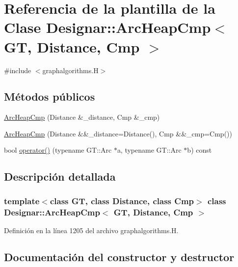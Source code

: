 \hypertarget{class_designar_1_1_arc_heap_cmp}{}\section{Referencia de la plantilla de la Clase Designar\+:\+:Arc\+Heap\+Cmp$<$ GT, Distance, Cmp $>$}
\label{class_designar_1_1_arc_heap_cmp}


{\ttfamily \#include $<$graphalgorithms.\+H$>$}

\subsection*{Métodos públicos}
\begin{DoxyCompactItemize}
\item 
\hyperlink{class_designar_1_1_arc_heap_cmp_a0fcb5ba151f45638b73534dc80af8a81}{Arc\+Heap\+Cmp} (Distance \&\+\_\+distance, Cmp \&\+\_\+cmp)
\item 
\hyperlink{class_designar_1_1_arc_heap_cmp_a4a698d49f62f6261afcf3c49e4c09381}{Arc\+Heap\+Cmp} (Distance \&\&\+\_\+distance=Distance(), Cmp \&\&\+\_\+cmp=Cmp())
\item 
bool \hyperlink{class_designar_1_1_arc_heap_cmp_a9d86fd876bad098a0a6844e9b302f141}{operator()} (typename G\+T\+::\+Arc $\ast$a, typename G\+T\+::\+Arc $\ast$b) const
\end{DoxyCompactItemize}


\subsection{Descripción detallada}
\subsubsection*{template$<$class GT, class Distance, class Cmp$>$\newline
class Designar\+::\+Arc\+Heap\+Cmp$<$ G\+T, Distance, Cmp $>$}



Definición en la línea 1205 del archivo graphalgorithms.\+H.



\subsection{Documentación del constructor y destructor}
\mbox{\label{class_designar_1_1_arc_heap_cmp_a0fcb5ba151f45638b73534dc80af8a81}} 
